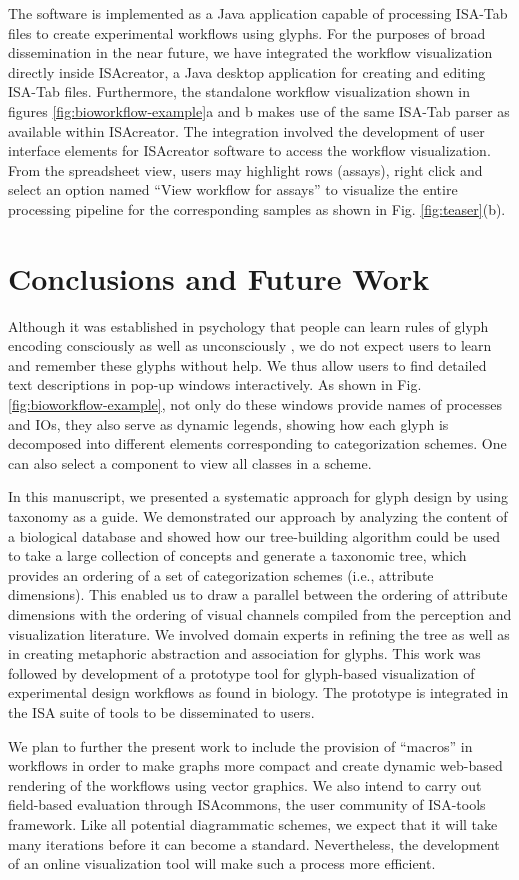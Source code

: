The software is implemented as a Java application capable of processing ISA-Tab files to create experimental workflows using glyphs. For the purposes of broad dissemination in the near future, we have integrated the workflow visualization directly inside ISAcreator, a Java desktop application for creating and editing ISA-Tab files. Furthermore, the standalone workflow visualization shown in figures \ref{fig:bioworkflow-example}a and b makes use of the same ISA-Tab parser as available within ISAcreator. The integration involved the development of user interface elements for ISAcreator software to access the workflow visualization.
From the spreadsheet view, users may highlight rows (assays), right click and select an option named ``View workflow for assays'' to visualize the entire processing pipeline for the corresponding samples as shown in Fig. \ref{fig:teaser}(b).

\section{Conclusions and Future Work}
\label{sec:Conclusion}

Although it was established in psychology that people can learn rules of glyph encoding consciously as well as unconsciously \cite{franks71}, we do not expect users to learn and remember these glyphs without help. We thus allow users to find detailed text descriptions in pop-up windows interactively. As shown in Fig. \ref{fig:bioworkflow-example}, not only do these windows provide names of processes and IOs, they also serve as dynamic legends, showing how each glyph is decomposed into different elements corresponding to categorization schemes. One can also select a component to view all classes in a scheme.   

In this manuscript, we presented a systematic approach for glyph
design by using taxonomy as a guide. We demonstrated our approach by analyzing the content of a biological database and showed how our tree-building algorithm
could be used to take a large collection of concepts and generate a taxonomic tree, which
provides an ordering of a set of categorization schemes (i.e., attribute dimensions).
This enabled us to draw a parallel between the ordering of attribute dimensions with the ordering of visual channels compiled from the perception and visualization literature. 
We involved domain experts in refining the tree as well as in creating metaphoric abstraction and association for glyphs.
This work was followed by development of a prototype tool for glyph-based visualization of experimental design workflows as found in biology.
The prototype is integrated in the ISA suite of tools to be disseminated to users.

We plan to further the present work to include the provision of ``macros'' in workflows in order to make graphs more compact and create dynamic web-based rendering of the workflows using vector graphics.
We also intend to carry out field-based evaluation through ISAcommons, the user community of ISA-tools framework.
Like all potential diagrammatic schemes, we expect that it will take many iterations before it can become a standard.
Nevertheless, the development of an online visualization tool will make such a process more efficient.